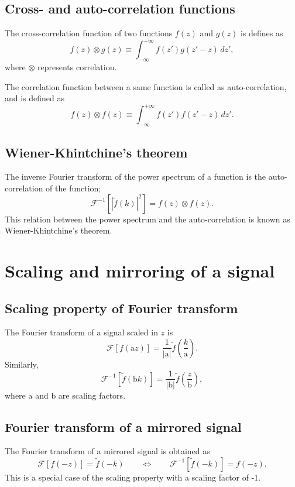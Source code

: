 \documentclass[a4paper]{article}
\newcommand{\ftf}[1]{{\mathcal{F}\left[#1\right]\xspace}}
\newcommand{\iftf}[1]{{\mathcal{F}^{-1}\left[#1\right]\xspace}}
\newcommand{\ftt}[1]{{\tilde{#1}\xspace}}
\newcommand{\cst}[1]{{\mathrm{#1}}\xspace}
\begin{document}
\subsection*{Cross- and auto-correlation functions}
The cross-correlation function of two functions $f(z)$ and $g(z)$ is defines as
\begin{equation}
	f(z) \otimes g(z) \equiv \int_{-\infty}^{+\infty} f(z') g(z'-z)\, dz',
\end{equation}
where $\otimes$ represents correlation.

The correlation function between a same function is called as auto-correlation, and is defined as
\begin{equation}
	f(z) \otimes f(z) \equiv \int_{-\infty}^{+\infty} f(z') f(z'-z)\, dz'.
\end{equation}

\subsection*{Wiener-Khintchine’s theorem}
The inverse Fourier transform of the power spectrum of a function is the auto-correlation of the function;
\begin{equation}
	\iftf{ \left|\ftt{f}(k)\right|^2} = f(z) \otimes f(z).
\end{equation}
This relation between the power spectrum and the auto-correlation is known as Wiener-Khintchine’s theorem.

\section{Scaling and mirroring of a signal}
\subsection*{Scaling property of Fourier transform}
The Fourier transform of a signal scaled in $z$ is
\begin{equation}
	\ftf{ f(\cst{a} z) } = \frac{1}{\left|\cst{a}\right|} \ftt{f}\left(\frac{k}{\cst{a}}\right).
\end{equation}
Similarly,
\begin{equation}
	\iftf{ \ftt{f}(\cst{b} k) } = \frac{1}{\left|\cst{b}\right|} \ftt{f}\left(\frac{z}{\cst{b}}\right),
\end{equation}
where $\cst{a}$ and $\cst{b}$ are scaling factors.

\subsection*{Fourier transform of a mirrored signal}
The Fourier transform of a mirrored signal is obtained as
\begin{equation}
	\ftf{ f(-z) } = \ftt{f} (-k) 
	\qquad \Leftrightarrow \qquad
	\iftf{ \ftt{f}(-k) } = f(-z).
\end{equation}
This is a special case of the scaling property with a scaling factor of -1.
\end{document}
